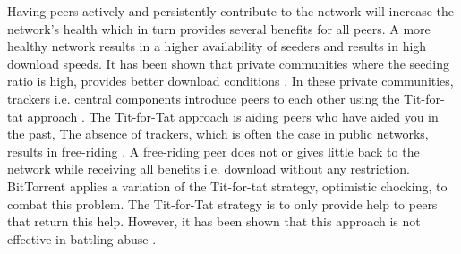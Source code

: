 \documentclass[11pt,twoside,a4paper,openright]{report}
\begin{document}
Having peers actively and persistently contribute to the network will increase the network's health which in turn provides several benefits for all peers.
A more healthy network results in a higher availability of seeders and results in high download speeds.
It has been shown that private communities where the seeding ratio is high, provides better download conditions \cite{meulpolder-privatecommunities}.
In these private communities, trackers i.e. central components introduce peers to each other using the Tit-for-tat approach \cite{cohen-titfortat}.
The Tit-for-Tat approach is aiding peers who have aided you in the past,
The absence of trackers, which is often the case in public networks, results in free-riding \cite{Adar-Freeriding}.
A free-riding peer does not or gives little back to the network while receiving all benefits i.e. download without any restriction.
BitTorrent applies a variation of the Tit-for-tat strategy, optimistic chocking, to combat this problem.
The Tit-for-Tat strategy is to only provide help to peers that return this help.
However, it has been shown that this approach is not effective in battling abuse \cite{Pouwelse-tribler}.






%



%
\end{document}
